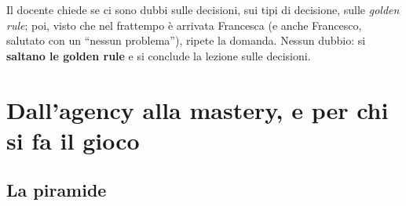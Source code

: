 Il docente chiede se ci sono dubbi sulle decisioni, sui tipi di decisione, sulle
\emph{golden rule}; poi, visto che nel frattempo è arrivata Francesca (e anche
Francesco, salutato con un ``nessun problema''), ripete la domanda. Nessun
dubbio: si \textbf{saltano le golden rule} e si conclude la lezione sulle decisioni.

\section{Dall'agency alla mastery, e per chi si fa il gioco}
\label{gd18:sec:piramide}

\subsection{La piramide}

